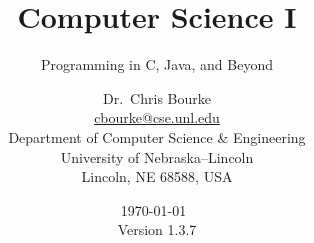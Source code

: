 \usepackage[boxed,slide,linesnumbered,algochapter]{algorithm2e}
\DontPrintSemicolon
{} %
\IncMargin{5em}
\SetAlCapSkip{1em}
\setlength{\algomargin}{2em} %
\SetVlineSkip{0em}

\usepackage[yyyymmdd,hhmmss]{datetime}

\theoremstyle{definition}
\newtheorem{theorem}{Theorem}
\newtheorem{exer}{Exercise}

\newtheorem{problem}{Problem}


\newcommand{\Neg}{\ensuremath{\neg}}
\renewcommand{\And}{\ensuremath{\mathbin{\textsc{And}}}}
\newcommand{\Or}{\ensuremath{\mathbin{\textsc{Or}}}}
\newcommand{\True}{\emph{true}\xspace}
\newcommand{\False}{\emph{false}\xspace}
\newcommand{\Null}{\textsc{Null}}

\title{Computer Science I}
\subtitle{Programming in C, Java, and Beyond}
\author{Dr.\ Chris Bourke\\
        \href{mailto:cbourke@cse.unl.edu}{cbourke@cse.unl.edu} \\
        Department of Computer Science \& Engineering\\
        University of Nebraska--Lincoln\\
        Lincoln, NE 68588, USA
}

\date{\today\  \currenttime \\ Version 1.3.7}
